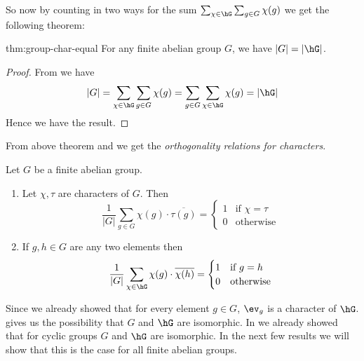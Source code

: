 So now by counting in two ways for the sum $\sum_{\chi\in \hG}\sum_{g\in G}\chi(g)$ we get the following theorem:
\begin{Theorem}{}{thm:group-char-equal}
  For any finite abelian group $G$, we have $|G|=|\hG|$.
\end{Theorem}
\begin{proof}
  From  we have $$|G|=\sum_{\chi\in \hG}\sum_{g\in G}\chi(g)=\sum_{g\in G}\sum_{\chi\in \hG}\chi(g)=|\hG|$$Hence we have the result.
\end{proof}

From above theorem and  we get the \emph{orthogonality relations for characters}.
\begin{observation}\label{obs:orthogonal-relation}
  Let $G$ be a finite abelian group.
  \begin{enumerate}[label=(\roman*)]
    \item Let $\chi,\tau$ are characters of $G$. Then $$\frac{1}{|G|}\sum_{g\in G}\chi(g)\cdot \overline {\tau(g)}=\begin{cases}
              1 & \text{if $\chi=\tau$} \\
              0 & \text{otherwise}
            \end{cases}$$
    \item If $g,h\in G$ are any two elements then $$\frac{1}{|G|}\sum_{\chi\in \hG}\chi(g)\cdot \overline{\chi(h)}=\begin{cases}
              1 & \text{if $g=h$}  \\
              0 & \text{otherwise}
            \end{cases}$$
  \end{enumerate}
\end{observation}

Since we already showed that for every element $g\in G$, $\ev_g$ is a character of $\hG$.  gives us the possibility that $G$ and $\hG$ are isomorphic. In  we already showed that for cyclic groups $G$ and $\hG$ are isomorphic. In the next few results we will show that this is the case for all finite abelian groups.


